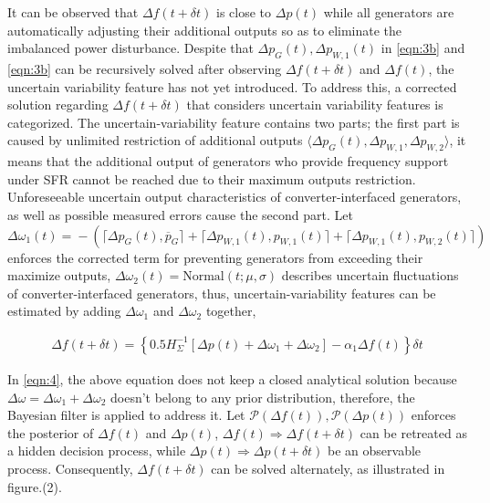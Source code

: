 \documentclass[lettersize,journal]{IEEEtran}
\begin{document}
It can be observed that \(\varDelta f(t\!+\!\delta t)\) is close to \(\varDelta p(t)\) while all generators are automatically adjusting their additional outputs so as to eliminate the imbalanced power disturbance.
Despite that \( \varDelta p_{G}(t), \varDelta p_{W,1}(t) \) in \eqref{eqn:3b} and \eqref{eqn:3b} can be recursively solved after observing \(\varDelta f(t\!+\! \delta t)\) and \(\varDelta f(t)\), the uncertain variability feature has not yet introduced. To address this, a corrected solution regarding $\varDelta f (t\!+\!\delta t)$ that considers uncertain variability features is categorized. The uncertain-variability feature contains two parts; the first part is caused by unlimited restriction of additional outputs \(\langle \varDelta p_{G}(t),\varDelta p_{W, 1},\varDelta p_{W,2}\rangle\), it means that the additional output of generators who provide frequency support under SFR cannot be reached due to their maximum outputs restriction. Unforeseeable uncertain output characteristics of converter-interfaced generators, as well as possible measured errors cause the second part. 
Let \(\varDelta \omega_{1}(t)\!=\!-\!\left(\lceil \varDelta p_{G}(t), \overline{p}_{G} \rceil \!+\! \lceil \varDelta p_{W,1}(t), {p}_{W,1}(t)\rceil  \!+\! \lceil \varDelta p_{W,1}(t), {p}_{W,2}(t)\rceil\right)  \) enforces the corrected term for preventing generators from exceeding their maximize outputs, \(\varDelta \omega_{2}(t)=\textrm{Normal}(t; \mu, \sigma)\) describes uncertain fluctuations of converter-interfaced
generators, thus, uncertain-variability features can be estimated by adding \(\varDelta \omega_{1}\) and \(\varDelta \omega_{2}\) together,
\vspace{-0.125in}

\begin{newsubequations}\label{eqn:4}
	\begin{align}
		\varDelta f(t\!+\!\delta t) \!=\!  \left\{ 0.5 {H_{\varSigma}^{-1}}[\varDelta p(t) \!+\! \varDelta \omega_1 \!+\!  \varDelta \omega_2 ] \!-\! \alpha_1 \varDelta f(t)\right\} \delta t 
		\label{eqn:4a}\end{align}
\end{newsubequations}

In \eqref{eqn:4}, the above equation does not keep a closed analytical solution because \(\varDelta \omega \!=\! \varDelta \omega_1 \!+\! \varDelta \omega_2\) doesn't belong to any prior distribution, therefore, the Bayesian filter is applied to address it. Let \(\mathcal{P} (\varDelta f(t))\!,\! \mathcal{P}(\varDelta p(t))\) enforces the posterior of \(\varDelta f(t)\) and \(\varDelta p(t)\), \(\varDelta f(t) \Rightarrow \varDelta f(t + \delta t)\) can be retreated as a hidden decision process, while \(\varDelta p(t)\Rightarrow \varDelta p(t+\delta t)\) be an observable process. Consequently, \(\varDelta f(t + \delta t)\) can be solved alternately, as illustrated in figure.(2).
\end{document}
